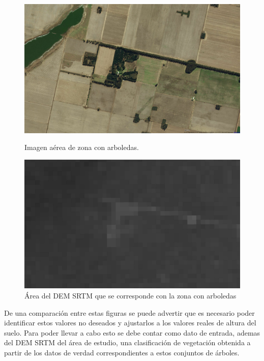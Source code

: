 \documentclass[10pt,a4paper, twoside]{report}
\begin{document}
\begin{figure}[!htb]
   \begin{minipage}{0.48\textwidth}
			\centering
			\includegraphics[width=1.0\linewidth]{imagenes/BingArboledas.jpg}
			\caption{Imagen aérea de zona con arboledas.}
			\label{BingArboledas}
   \end{minipage}\hfill
   \begin {minipage}{0.48\textwidth}
			\centering
			\includegraphics[width=1.0\linewidth]{imagenes/DEMConArboledas.jpg}
			\caption{Área del DEM SRTM que se corresponde con la zona con arboledas}
			\label{DEMConArboledas}
   \end{minipage}
\end{figure}

De una comparación entre estas figuras se puede advertir que es necesario poder identificar estos valores no deseados y ajustarlos a los valores reales de altura del suelo. Para poder llevar a cabo esto se debe contar como dato de entrada, ademas del DEM SRTM del área de estudio, una clasificación de vegetación obtenida a partir de los datos de verdad correspondientes a estos conjuntos de árboles.
\end{document}
